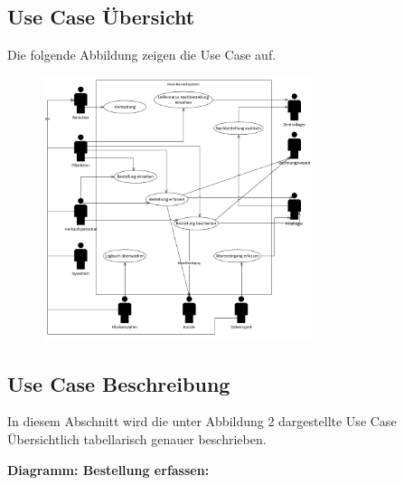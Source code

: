 \subsection{Use Case Übersicht}
Die folgende Abbildung zeigen die Use Case auf.

\begin{figure}[H]%
\centering
\includegraphics[width=0.7\textwidth]{Images/usecase-u.png}
\label{fig:usecase}
\end{figure}

\clearpage
\subsection{Use Case Beschreibung}
In diesem Abschnitt wird die unter Abbildung 2 dargestellte Use Case Übersichtlich tabellarisch genauer beschrieben.






\newpage
\textbf{Diagramm: Bestellung erfassen:}

